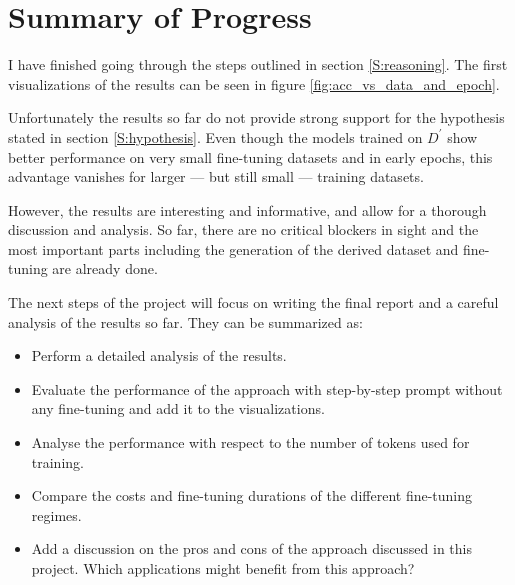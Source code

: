 \documentclass[11pt]{article}
\begin{document}
    \section{Summary of Progress}

    I have finished going through the steps outlined in section \ref{S:reasoning}.
    The first visualizations of the results can be seen in figure \ref{fig:acc_vs_data_and_epoch}.

    Unfortunately the results so far do not provide strong support for the hypothesis stated in section \ref{S:hypothesis}.
    Even though the models trained on $D^\prime$ show better performance on very small fine-tuning datasets and in early
    epochs, this advantage vanishes for larger --- but still small --- training datasets.

    However, the results are interesting and informative, and allow for a thorough discussion and analysis.
    So far, there are no critical blockers in sight and the most important parts including the generation of the derived
    dataset and fine-tuning are already done.

    The next steps of the project will focus on writing the final report and a careful analysis of the results so far.
    They can be summarized as:
    \begin{itemize}
        \item Perform a detailed analysis of the results.
        \item Evaluate the performance of the approach with step-by-step prompt without any fine-tuning
        and add it to the visualizations.
        \item Analyse the performance with respect to the number of tokens used for training.
        \item Compare the costs and fine-tuning durations of the different fine-tuning regimes.
        \item Add a discussion on the pros and cons of the approach discussed in this project. Which applications might
        benefit from this approach?
    \end{itemize}
\end{document}
